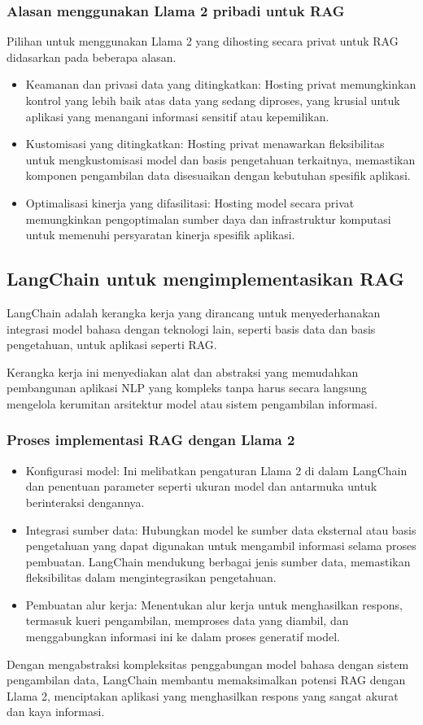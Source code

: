 \documentclass{article}
\begin{document}
\subsubsection{Alasan menggunakan Llama 2 pribadi untuk RAG}
Pilihan untuk menggunakan Llama 2 yang dihosting secara privat untuk RAG didasarkan pada beberapa alasan.
\begin{itemize}
    \item Keamanan dan privasi data yang ditingkatkan: Hosting privat memungkinkan kontrol yang lebih baik atas data yang sedang diproses, yang krusial untuk aplikasi yang menangani informasi sensitif atau kepemilikan.
    \item Kustomisasi yang ditingkatkan: Hosting privat menawarkan fleksibilitas untuk mengkustomisasi model dan basis pengetahuan terkaitnya, memastikan komponen pengambilan data disesuaikan dengan kebutuhan spesifik aplikasi.
    \item Optimalisasi kinerja yang difasilitasi: Hosting model secara privat memungkinkan pengoptimalan sumber daya dan infrastruktur komputasi untuk memenuhi persyaratan kinerja spesifik aplikasi.
\end{itemize}

\subsection{LangChain untuk mengimplementasikan RAG}
LangChain adalah kerangka kerja yang dirancang untuk menyederhanakan integrasi model bahasa dengan teknologi lain, seperti basis data dan basis pengetahuan, untuk aplikasi seperti RAG.

Kerangka kerja ini menyediakan alat dan abstraksi yang memudahkan pembangunan aplikasi NLP yang kompleks tanpa harus secara langsung mengelola kerumitan arsitektur model atau sistem pengambilan informasi.

\subsubsection{Proses implementasi RAG dengan Llama 2}
\begin{itemize}
    \item Konfigurasi model: Ini melibatkan pengaturan Llama 2 di dalam LangChain dan penentuan parameter seperti ukuran model dan antarmuka untuk berinteraksi dengannya.
    \item Integrasi sumber data: Hubungkan model ke sumber data eksternal atau basis pengetahuan yang dapat digunakan untuk mengambil informasi selama proses pembuatan. LangChain mendukung berbagai jenis sumber data, memastikan fleksibilitas dalam mengintegrasikan pengetahuan.
    \item Pembuatan alur kerja: Menentukan alur kerja untuk menghasilkan respons, termasuk kueri pengambilan, memproses data yang diambil, dan menggabungkan informasi ini ke dalam proses generatif model.
\end{itemize}
Dengan mengabstraksi kompleksitas penggabungan model bahasa dengan sistem pengambilan data, LangChain membantu memaksimalkan potensi RAG dengan Llama 2, menciptakan aplikasi yang menghasilkan respons yang sangat akurat dan kaya informasi.
\end{document}

